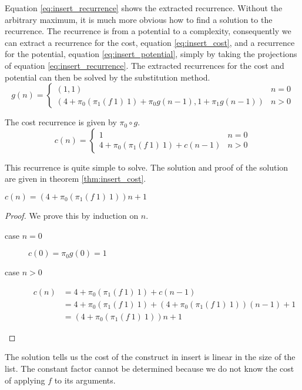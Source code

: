 Equation \ref{eq:insert_recurrence} shows the extracted recurrence.
Without the arbitrary maximum, it is much more obvious how to find a solution to the recurrence.
The recurrence is from a potential to a complexity, consequently we can extract a recurrence for the cost,
equation \ref{eq:insert_cost}, and a recurrence for the potential, equation \ref{eq:insert_potential}, simply by taking the projections of equation \ref{eq:insert_recurrence}.
The extracted recurrences for the cost and potential can then be solved by the substitution method.
\begin{equation}
  \label{eq:insert_recurrence}
  g(n) = \begin{cases}
    (1,1) & n = 0 \\
    (4 + \pi_0(\pi_1(f\ 1)\ 1) + \pi_0g(n-1), 1+\pi_1g(n-1)) & n > 0
  \end{cases}
\end{equation}

The cost recurrence is given by $\pi_0 \circ g$.
\begin{equation}
\label{eq:insert_cost}
c(n) = \begin{cases}
  1 & n = 0 \\
  4 + \pi_0(\pi_1(f\ 1)\ 1) + c(n-1) & n > 0
\end{cases}
\end{equation}

This recurrence is quite simple to solve.
The solution and proof of the solution are given in theorem \ref{thm:insert_cost}.
\begin{theorem}
\label{thm:insert_cost}
  $c(n) = (4 + \pi_0(\pi_1(f\ 1)\ 1))n + 1$
\end{theorem}
\begin{proof}
  We prove this by induction on $n$.
  \begin{description}
    \item[case $n=0$] $c(0) = \pi_0g(0) = 1$
    \item[case $n>0$]
      \begin{align*}
        c(n) &= 4 + \pi_0(\pi_1(f\ 1)\ 1) + c(n-1) \\
        &= 4 + \pi_0(\pi_1(f\ 1)\ 1) + (4 + \pi_0(\pi_1(f\ 1)\ 1))(n-1) + 1 \\
        &= (4 + \pi_0(\pi_1(f\ 1)\ 1)) n + 1
      \end{align*}
  \end{description}
\end{proof}
The solution tells us the cost of the  construct in insert is linear in the size of the list.
The constant factor cannot be determined because we do not know the cost of applying $f$ to its arguments.

